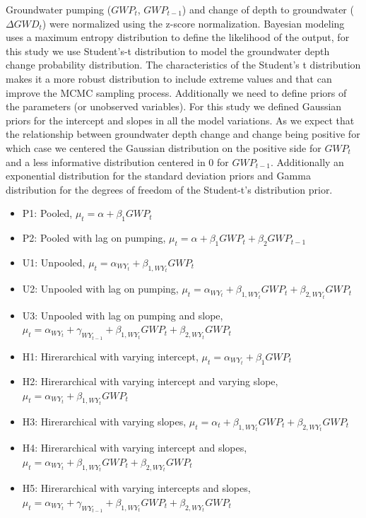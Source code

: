 \documentclass[11pt,a4paper]{article}
\begin{document}
Groundwater pumping ($GWP_{t}$, $GWP_{t-1}$) and change of depth to groundwater ($\Delta{GWD}_t$) were normalized using the z-score normalization. Bayesian modeling uses a maximum entropy distribution to define the likelihood of the output, for this study we use Student's-t distribution to model the groundwater depth change probability distribution. The characteristics of the Student's t distribution makes it a more robust distribution to include extreme values and that can improve the MCMC sampling process. Additionally we need to define priors of the parameters (or unobserved variables). For this study we defined Gaussian priors for the intercept and slopes in all the model variations. As we expect that the relationship between groundwater depth change and change being positive for which case we centered the Gaussian distribution on the positive side for ${GWP}_t$ and a less informative distribution centered in 0 for ${GWP}_{t-1}$. Additionally an exponential distribution for the standard deviation priors  and Gamma distribution for the degrees of freedom of the Student-t's distribution prior. 

\begin{itemize}[noitemsep,topsep=4pt]
  \item P1: Pooled,   $\mu_t = \alpha + \beta_{1}GWP_{t}$
  \item P2: Pooled with lag on pumping,   $\mu_t = \alpha + \beta_{1}GWP_{t} + \beta_{2}GWP_{t-1} $
  \item U1: Unpooled, $\mu_t = \alpha_{WY_{t}} + \beta_{1,WY_{t}}GWP_{t}$
  \item U2: Unpooled with lag on pumping, $\mu_t = \alpha_{WY_{t}} + \beta_{1,WY_{t}}GWP_{t} + \beta_{2,WY_{t}}GWP_{t} $
  \item U3: Unpooled with lag on pumping and slope, $\mu_t =  \alpha_{WY_{t}} + \gamma_{WY_{t-1}} + \beta_{1,WY_{t}}GWP_{t} + \beta_{2,WY_{t}}GWP_{t}$
  \item H1: Hirerarchical with varying intercept, $\mu_t = \alpha_{WY_{t}} + \beta_{1}GWP_{t}$
  \item H2: Hirerarchical with varying intercept and varying slope, $\mu_t = \alpha_{WY_{t}} + \beta_{1,WY_{t}}GWP_{t}$
  \item H3: Hirerarchical with varying slopes, $\mu_t = \alpha_t + \beta_{1,WY_{t}}GWP_{t} + \beta_{2,WY_{t}}GWP_{t}$
  \item H4: Hirerarchical with varying intercept and slopes, $\mu_t = \alpha_{WY_{t}} + \beta_{1,WY_{t}}GWP_{t} + \beta_{2,WY_{t}}GWP_{t}$
  \item H5: Hirerarchical with varying intercepts and slopes, $\mu_t = \alpha_{WY_{t}} + \gamma_{WY_{t-1}} + \beta_{1,WY_{t}}GWP_{t} + \beta_{2,WY_{t}}GWP_{t}$
\end{itemize}
\end{document}
